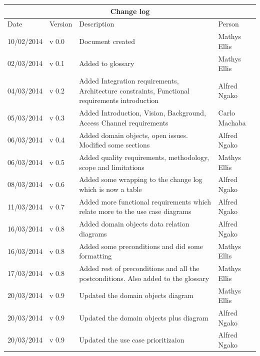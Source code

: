 \documentclass[12pt]{article}
\begin{document}
\begin{center}
\begin{tabular}{|l|p{1.4cm}|p{8cm}|p{2.8cm}|}
\hline
\multicolumn{4}{|c|}{\bf Change log} \\
\hline
 Date & Version & Description &  Person \\
\hline
10/02/2014 & v 0.0 & Document created & Mathys Ellis \\
\hline
02/03/2014 & v 0.1 & Added to glossary & Mathys Ellis \\
\hline
04/03/2014 & v 0.2 & Added Integration requirements, Architecture constraints, Functional requirements introduction & Alfred Ngako \\
\hline
05/03/2014 & v 0.3 & Added Introduction, Vision, Background, Access Channel requirements & Carlo Machaba \\
\hline
06/03/2014 & v 0.4 & Added domain objects, open issues. Modified some sections & Alfred Ngako \\
\hline
06/03/2014 & v 0.5 & Added quality requirements, methodology, scope and limitations & Mathys Ellis \\
\hline
08/03/2014 & v 0.6 & Added some wrapping to the change log which is now a table & Alfred Ngako \\
\hline
11/03/2014 & v 0.7 & Added more functional requirements which relate more to the use case diagrams & Alfred Ngako \\
\hline
16/03/2014 & v 0.8 & Added domain objects data relation diagrams & Alfred Ngako \\
\hline
16/03/2014 & v 0.8 & Added some preconditions and did some formatting & Mathys Ellis \\
\hline
17/03/2014 & v 0.8 & Added rest of preconditions and all the postconditions. Also added to the glossary & Mathys Ellis \\
\hline
20/03/2014 & v 0.9 & Updated the domain objects diagram  & Mathys Ellis \\
\hline
20/03/2014 & v 0.9 & Updated the domain objects plus diagram  & Alfred Ngako \\
\hline
20/03/2014 & v 0.9 & Updated the use case prioritizaion  & Alfred Ngako \\
\hline

\end{tabular}
\end{center}
\newpage
\tableofcontents

\listoffigures
\newpage
\end{document}
